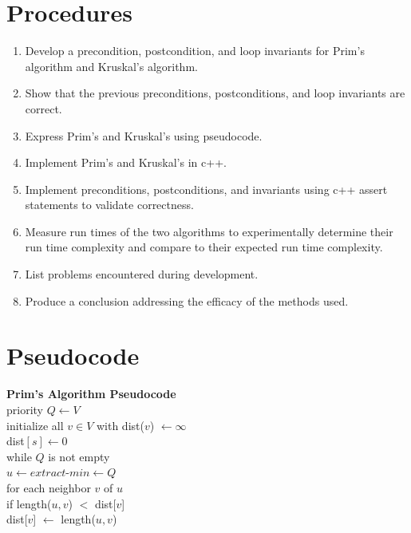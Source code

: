 \documentclass[a4paper]{article}
\begin{document}
    
    \section{Procedures}
    \begin{enumerate}

        \item Develop a precondition, postcondition, and loop invariants for Prim's
              algorithm and Kruskal's algorithm.
        
        \item Show that the previous preconditions, postconditions, and loop invariants
              are correct.
        
        \item Express Prim's and Kruskal's using pseudocode.

        \item Implement Prim's and Kruskal's in c++.
        
        \item Implement preconditions, postconditions, and invariants using c++ 
              assert statements to validate correctness.
        
        \item Measure run times of the two algorithms to experimentally determine their
              run time complexity and compare to their expected run time complexity.
        
        \item List problems encountered during development.

        \item Produce a conclusion addressing the efficacy of the methods used.

    \end{enumerate}


    \section{Pseudocode}
    \textbf{Prim's Algorithm Pseudocode} \\
    priority $Q \leftarrow V$ \\
    initialize all $v \in V$ with dist($v$)  $\leftarrow \infty$ \\
    dist$[s] \leftarrow 0$ \\
    while $Q$ is not empty \\
    \phantom{hell}$u \leftarrow extract$-$min \leftarrow Q$ \\
    \phantom{hell}for each neighbor $v$ of $u$ \\
    \phantom{hellhell}if length($u,v$) $<$ dist[$v$] \\
    \phantom{hellhellhell}dist[$v$] $\leftarrow$ length($u,v$) \\
\end{document}
